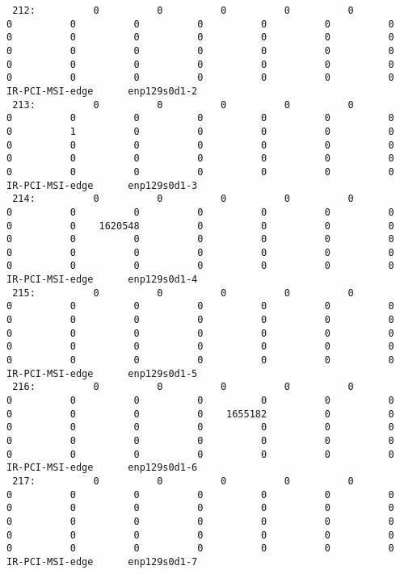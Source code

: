 \begin{lstlisting}
 212:          0          0          0          0          0          0          0          0          0          0          0          0          0          0          0          0          0          0          0          0          0          0          0          0          0          0          0          0          0          0          0          0          0          0          0          0          0          0          0          0  IR-PCI-MSI-edge      enp129s0d1-2
 213:          0          0          0          0          0          0          0          0          0          0          0          0          0          1          0          0          0          0          0          0          0          0          0          0          0          0          0          0          0          0          0          0          0          0          0          0          0          0          0          0  IR-PCI-MSI-edge      enp129s0d1-3
 214:          0          0          0          0          0          0          0          0          0          0          0          0          0          0    1620548          0          0          0          0          0          0          0          0          0          0          0          0          0          0          0          0          0          0          0          0          0          0          0          0          0  IR-PCI-MSI-edge      enp129s0d1-4
 215:          0          0          0          0          0          0          0          0          0          0          0          0          0          0          0          0          0          0          0          0          0          0          0          0          0          0          0          0          0          0          0          0          0          0          0          0          0          0          0          0  IR-PCI-MSI-edge      enp129s0d1-5
 216:          0          0          0          0          0          0          0          0          0          0          0          0          0          0          0          0    1655182          0          0          0          0          0          0          0          0          0          0          0          0          0          0          0          0          0          0          0          0          0          0          0  IR-PCI-MSI-edge      enp129s0d1-6
 217:          0          0          0          0          0          0          0          0          0          0          0          0          0          0          0          0          0          0          0          0          0          0          0          0          0          0          0          0          0          0          0          0          0          0          0          0          0          0          0          0  IR-PCI-MSI-edge      enp129s0d1-7

\end{lstlisting}
